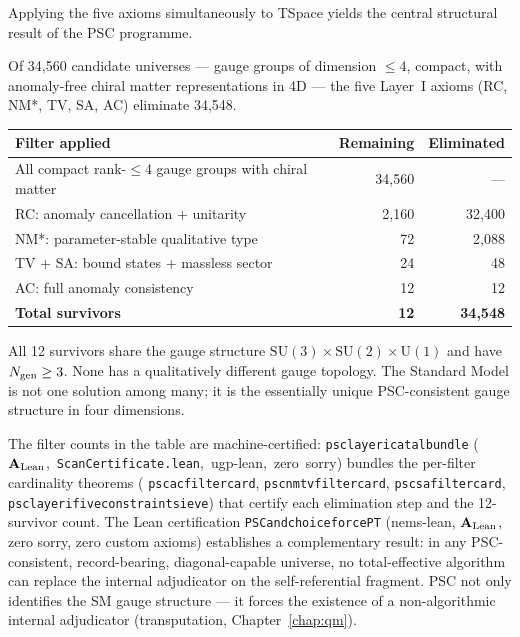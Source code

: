 \documentclass[11pt,openany]{book}
\theoremstyle{remark}
\newcommand{\lean}[1]{%
  \penalty-100
  \begingroup\def\_{\textunderscore\allowbreak}\texttt{#1}\endgroup}
\newcommand{\Ngen}{N_{\rm gen}}
\newcommand{\CatAL}{\ensuremath{\textbf{A}_{\rm Lean}}}
\begin{document}
Applying the five axioms simultaneously to TSpace yields the central structural
result of the PSC programme.

\begin{tcolorbox}[colback=orange!5,colframe=orange!60,
  title={Result: Layer~I Survivor Count (\CatAL, conditional on TSpace + PSC axiom package)}]
Of 34,560 candidate universes --- gauge groups of dimension $\leq 4$, compact, with
anomaly-free chiral matter representations in 4D --- the five Layer~I axioms
(RC, NM*, TV, SA, AC) eliminate 34,548.

\medskip
{\small
\begin{tabularx}{\linewidth}{@{}lrr@{}}
\toprule
\textbf{Filter applied} & \textbf{Remaining} & \textbf{Eliminated} \\
\midrule
All compact rank-$\leq$4 gauge groups with chiral matter & 34,560 & --- \\
RC: anomaly cancellation + unitarity & 2,160 & 32,400 \\
NM*: parameter-stable qualitative type & 72 & 2,088 \\
TV + SA: bound states + massless sector & 24 & 48 \\
AC: full anomaly consistency & 12 & 12 \\
\midrule
\textbf{Total survivors} & \textbf{12} & \textbf{34,548} \\
\bottomrule
\end{tabularx}
}

\medskip
All 12 survivors share the gauge structure
$\mathrm{SU}(3)\times\mathrm{SU}(2)\times\mathrm{U}(1)$ and have $\Ngen \geq 3$.
None has a qualitatively different gauge topology. The Standard Model is not one
solution among many; it is the essentially unique PSC-consistent gauge structure
in four dimensions.
\end{tcolorbox}

The filter counts in the table are machine-certified:
\lean{psc\_layer\_i\_catal\_bundle} \mbox{(\CatAL, \texttt{ScanCertificate.lean}, ugp-lean, zero sorry)}
bundles the per-filter cardinality theorems
(\lean{psc\_ac\_filter\_card}, \lean{psc\_nm\_tv\_filter\_card},
\lean{psc\_sa\_filter\_card}, \lean{psc\_layer\_i\_five\_constraint\_sieve})
that certify each elimination step and the 12-survivor count.
The Lean certification \lean{PSC\_and\_choice\_force\_PT} (nems-lean, \CatAL, zero sorry, zero custom
axioms) establishes a complementary result: in any PSC-consistent, record-bearing, diagonal-capable universe, no
total-effective algorithm can replace the internal adjudicator on the self-referential
fragment. PSC not only identifies the SM gauge structure --- it forces the existence of
a non-algorithmic internal adjudicator (transputation, Chapter~\ref{chap:qm}).
\end{document}
